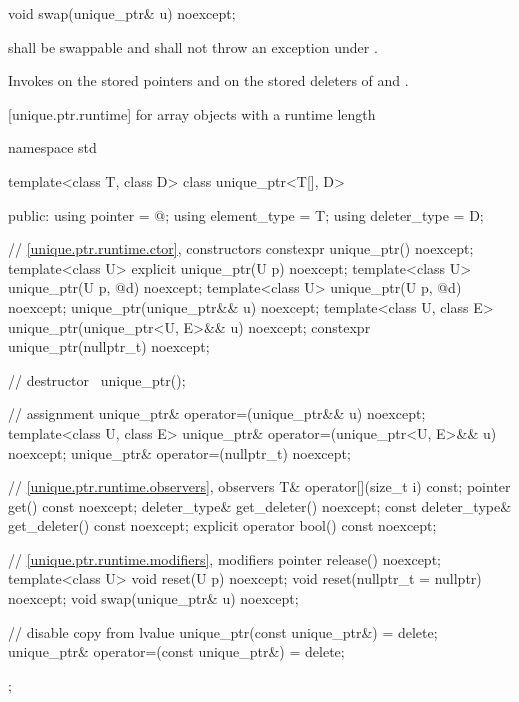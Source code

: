 %
\begin{itemdecl}
void swap(unique_ptr& u) noexcept;
\end{itemdecl}

\begin{itemdescr}
\pnum
\requires {} shall be
swappable and shall
not throw an exception
under .

\pnum
\effects Invokes  on the stored pointers and on the stored
deleters of  and .
\end{itemdescr}

[unique.ptr.runtime]{ for array objects with a runtime length}

%
\begin{codeblock}
namespace std {
  template<class T, class D> class unique_ptr<T[], D> {
  public:
    using pointer      = @\seebelow@;
    using element_type = T;
    using deleter_type = D;

    // \ref{unique.ptr.runtime.ctor}, constructors
    constexpr unique_ptr() noexcept;
    template<class U> explicit unique_ptr(U p) noexcept;
    template<class U> unique_ptr(U p, @\seebelow@ d) noexcept;
    template<class U> unique_ptr(U p, @\seebelow@ d) noexcept;
    unique_ptr(unique_ptr&& u) noexcept;
    template<class U, class E>
      unique_ptr(unique_ptr<U, E>&& u) noexcept;
    constexpr unique_ptr(nullptr_t) noexcept;

    // destructor
    ~unique_ptr();

    // assignment
    unique_ptr& operator=(unique_ptr&& u) noexcept;
    template<class U, class E>
      unique_ptr& operator=(unique_ptr<U, E>&& u) noexcept;
    unique_ptr& operator=(nullptr_t) noexcept;

    // \ref{unique.ptr.runtime.observers}, observers
    T& operator[](size_t i) const;
    pointer get() const noexcept;
    deleter_type& get_deleter() noexcept;
    const deleter_type& get_deleter() const noexcept;
    explicit operator bool() const noexcept;

    // \ref{unique.ptr.runtime.modifiers}, modifiers
    pointer release() noexcept;
    template<class U> void reset(U p) noexcept;
    void reset(nullptr_t = nullptr) noexcept;
    void swap(unique_ptr& u) noexcept;

    // disable copy from lvalue
    unique_ptr(const unique_ptr&) = delete;
    unique_ptr& operator=(const unique_ptr&) = delete;
  };
}
\end{codeblock}

